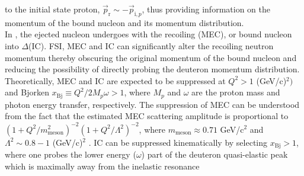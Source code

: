to the initial state proton, $\vec{p}_{\mathrm{r}} \sim -\vec{p}_{\mathrm{i},p}$, thus providing information on the momentum of the bound nucleon and its momentum distribution.\\
\indent In \DIFdelbegin {}\DIFdelend \DIFaddbegin {}\DIFaddend , the ejected nucleon undergoes \DIFdelbegin {}\DIFdelend \DIFaddbegin {}\DIFaddend with the recoiling \DIFdelbegin {}\DIFdelend \DIFaddbegin {}\DIFaddend (MEC), or \DIFdelbegin {}\DIFdelend \DIFaddbegin {}\DIFaddend bound nucleon into \DIFdelbegin {}\DIFdelend \DIFaddbegin {}\DIFaddend $\Delta$\DIFdelbegin {}\DIFdelend \DIFaddbegin {}\DIFaddend (IC). FSI, MEC and IC can significantly alter the recoiling neutron
momentum thereby obscuring the original momentum of the bound nucleon and reducing the possibility of directly probing the deuteron momentum distribution. \\
\indent Theoretically, MEC and IC are expected to be suppressed at $Q^{2}>1$ (GeV/c)$^{2})$ and Bjorken $x_{\mathrm{Bj}}\equiv Q^{2}/2M_{p}\omega>1$, where $M_{p}$ and $\omega$ are the proton mass and photon energy transfer, respectively\cite{sargsian_2015}.
The suppression of MEC can be understood from the fact that the estimated MEC scattering amplitude is proportional to  $(1 + Q^{2}/m^{2}_{\mathrm{meson}})^{-2}(1+Q^{2}/\Lambda^{2})^{-2}$, where $m_{\mathrm{meson}}\approx0.71$ GeV/c$^{2}$ and
$\Lambda^{2}\sim 0.8-1 $ (GeV/c)$^{2}$ \cite{Sargsian_2001}. \DIFaddbegin {}\DIFaddend IC can be suppressed kinematically by selecting $x_{\mathrm{Bj}}>1$, where one probes the lower energy ($\omega$) part of the deuteron quasi-elastic peak which is maximally away from the inelastic resonance
